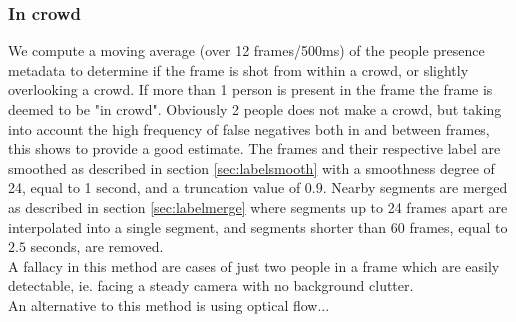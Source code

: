 \subsubsection{In crowd}\label{sec:incrowd}
%
We compute a moving average (over 12 frames/500ms) of the people presence metadata to determine if the frame is shot from within a crowd, or slightly overlooking a crowd. If more than 1 person is present in the frame the frame is deemed to be "in crowd". Obviously 2 people does not make a crowd, but taking into account the high frequency of false negatives both in and between frames, this shows to provide a good estimate. The frames and their respective label are smoothed as described in section \ref{sec:labelsmooth} with a smoothness degree of 24, equal to 1 second, and a truncation value of $0.9$. Nearby segments are merged as described in section \ref{sec:labelmerge} where segments up to 24 frames apart are interpolated into a single segment, and segments shorter than 60 frames, equal to $2.5$ seconds, are removed.\\
A fallacy in this method are cases of just two people in a frame which are easily detectable, ie. facing a steady camera with no background clutter.\\
An alternative to this method is using optical flow... %
%

